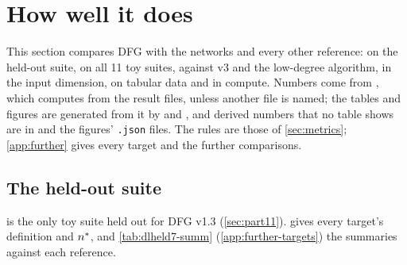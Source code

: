 \section{How well it does}\label{sec:results}

This section compares DFG with the networks and every other reference: on the held-out suite, on all 11 toy suites, against v3 and the low-degree algorithm, in the input dimension, on tabular data and in compute. Numbers come from , which  computes from the result files, unless another file is named; the tables and figures are generated from it by  and , and derived numbers that no table shows are in  and the figures' \texttt{.json} files. The rules are those of \cref{sec:metrics}; \cref{app:further} gives every target and the further comparisons.

\subsection{The held-out suite }\label{sec:res-dlheld7}

 is the only toy suite held out for DFG v1.3 (\cref{sec:part11}).  gives every target's definition and $\nstar$, and \cref{tab:dlheld7-summ} (\cref{app:further-targets}) the summaries against each reference.

\begin{table}[t]
\centering{\footnotesize\setlength{\tabcolsep}{3pt}\renewcommand{\arraystretch}{1.1}
\par\bigskip
{\scriptsize}}
\caption{The held-out toy suite  . (a)~$\nstar$ per target (mean of 3 seeds, interpolated in $\log n$; ``never'': 10\% test error not reached by $n=16384$) for DFG alone, v3, , the no-search baselines  and , the three network variants run on the suite and their per-target minimum . The last two columns give the $\log_2$ ratio of DFG alone's $\nstar$ to that of  and of v3 (n/a: neither learns the target). Bold: the smallest $\nstar$ in the row. (b)~The definitions. $[\cdot]$ is $+1$ when the condition holds and $-1$ otherwise; \texttt{*} multiplies $\pm1$ values; \texttt{c ? a : b} is $a$ when $c=+1$; a literal \texttt{x5} or \texttt{$-$x5} inside AND/OR or a decision list stands for $x_5=+1$ or $x_5=-1$. f7\_02, f7\_04 and f7\_06 are the family's non-symmetric controls. Source:  (\texttt{q1\_dlheld7}); definitions: .}
\label{tab:dlheld7}
\end{table}

